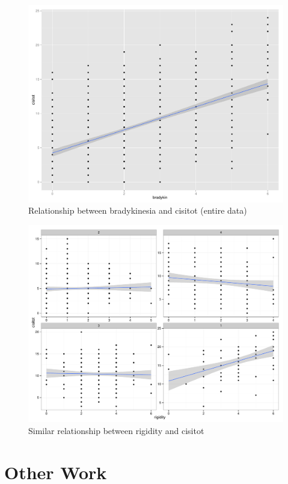 \documentclass[letterpaper,12pt]{article}
\begin{document}
\begin{figure}[h]
  \centering
  \includegraphics[width=\linewidth]{bradykin-cisitot-all.pdf}
  \caption{Relationship between bradykinesia and cisitot (entire data)}
  \label{fig:bradykin-cisitot-all}
\end{figure}

\begin{figure}[h]
  \centering
  \includegraphics[width=\linewidth]{rigidity-cisitot.pdf}
  \caption{Similar relationship between rigidity and cisitot}
  \label{fig:rigidity-cisitot}
\end{figure}

\section{Other Work}
\end{document}
